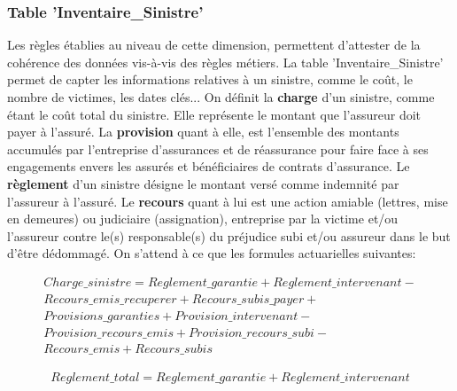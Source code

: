 \subsubsection{\textbf{Table 'Inventaire\_Sinistre'}}
Les r\`egles \'etablies au niveau de cette dimension, permettent d'attester de la coh\'erence des donn\'ees vis-\`a-vis des r\`egles m\'etiers. La table 'Inventaire\_Sinistre' permet de capter les informations relatives \`a un sinistre, comme le co\^ut, le nombre de victimes, les dates cl\'es... On d\'efinit la \textbf{charge} d'un sinistre, comme \'etant le co\^ut total du sinistre. Elle repr\'esente le montant que l'assureur doit payer \`a l'assur\'e. La \textbf{provision} quant \`a elle, est l'ensemble des montants accumul\'es par l'entreprise d'assurances et de r\'eassurance pour faire face \`a ses engagements envers les assur\'es et b\'en\'eficiaires de contrats d'assurance. Le \textbf{r\`eglement} d'un sinistre d\'esigne le montant vers\'e comme indemnit\'e par l'assureur \`a l'assur\'e. Le \textbf{recours} quant à lui est une action amiable (lettres, mise en demeures) ou judiciaire (assignation), entreprise par la victime et/ou l'assureur contre le(s) responsable(s) du pr\'ejudice subi et/ou assureur dans le but d'\^etre d\'edommag\'e. On s'attend \`a ce que les formules actuarielles suivantes: 

\begin{equation}
  \begin{split}                                  
   Charge\_sinistre =  Reglement\_garantie + Reglement\_intervenant - \\
       Recours\_emis\_recuperer + Recours\_subis\_payer + \\
       Provisions\_garanties +  Provision\_intervenant - \\
        Provision\_recours\_emis + Provision\_recours\_subi -\\
        Recours\_emis + Recours\_subis
  \end{split}
\end{equation}

\begin{equation}
\begin{split}  
	Reglement\_total =  Reglement\_garantie + Reglement\_intervenant 
 \end{split}
\end{equation}

